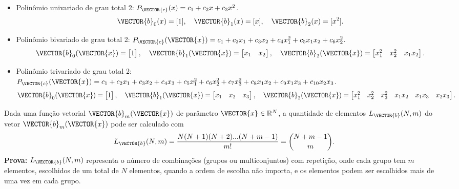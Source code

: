 \begin{example}\label{ex:theo:reglogrnr1poly:multinomio}~\\
\begin{itemize}
\item Polinômio univariado de grau total 2: 
$P_{\VECTOR{c}}(x)=c_1 + c_2 x + c_3 x^2$.
\begin{equation}
\VECTOR{b}_0(x)=[1],
\quad 
\VECTOR{b}_1(x)=[x],
\quad 
\VECTOR{b}_2(x)=[x^2].
\end{equation}
\item Polinômio bivariado de grau total 2: 
$P_{\VECTOR{c}}(\VECTOR{x})=c_1 + c_2 x_1 + c_3 x_2 + c_4 x_1^2 + c_5 x_1 x_2+ c_6 x_2^2$.
\begin{equation}
\VECTOR{b}_0(\VECTOR{x})=
\begin{bmatrix}
1
\end{bmatrix},
\quad 
\VECTOR{b}_1(\VECTOR{x})=
\begin{bmatrix}
x_1 & x_2
\end{bmatrix},
\quad 
\VECTOR{b}_2(\VECTOR{x})=
\begin{bmatrix}
x_1^2 & x_2^2 & x_1x_2
\end{bmatrix}.
\end{equation}
\item Polinômio trivariado de grau total 2: 
$P_{\VECTOR{c}}(\VECTOR{x})=c_1 + 
c_2 x_1 + c_3 x_2 + c_4 x_3 + 
c_5 x_1^2 + c_6 x_2^2 + c_7 x_3^2 + c_8 x_1 x_2+ c_9 x_1 x_3 + c_{10} x_2 x_3$.
\begin{equation}\label{eq:b0b1b2}
\VECTOR{b}_0(\VECTOR{x})=
\begin{bmatrix}
1
\end{bmatrix},
\quad 
\VECTOR{b}_1(\VECTOR{x})=
\begin{bmatrix}
x_1 & x_2 & x_3
\end{bmatrix},
\quad 
\VECTOR{b}_2(\VECTOR{x})=
\begin{bmatrix}
x_1^2 & x_2^2 & x_3^2 & x_1x_2 & x_1x_3 & x_2x_3
\end{bmatrix}.
\end{equation}
\end{itemize}
\end{example}

\begin{theorem}\label{theo:reglogrnr1poly:bm}
Dada uma função vetorial $\VECTOR{b}_m(\VECTOR{x})$ de parâmetro $\VECTOR{x}\in \mathbb{R}^{N}$,
a quantidade de elementos $L_{\VECTOR{b}}(N,m)$ do vetor $\VECTOR{b}_m(\VECTOR{x})$ pode ser calculado com 
\begin{equation}
L_{\VECTOR{b}}(N,m)=\frac{N(N+1)(N+2)...(N+m-1)}{m!}=\binom{N+m-1}{m}.
\end{equation}
\textbf{Prova:} $L_{\VECTOR{b}}(N,m)$ representa o número de combinações (grupos ou multiconjuntos) com repetição,
onde  cada grupo tem $m$ elementos,
escolhidos de um total de $N$ elementos, quando a ordem de escolha não importa, 
e os elementos podem ser escolhidos mais de uma vez em cada grupo.
\end{theorem}

